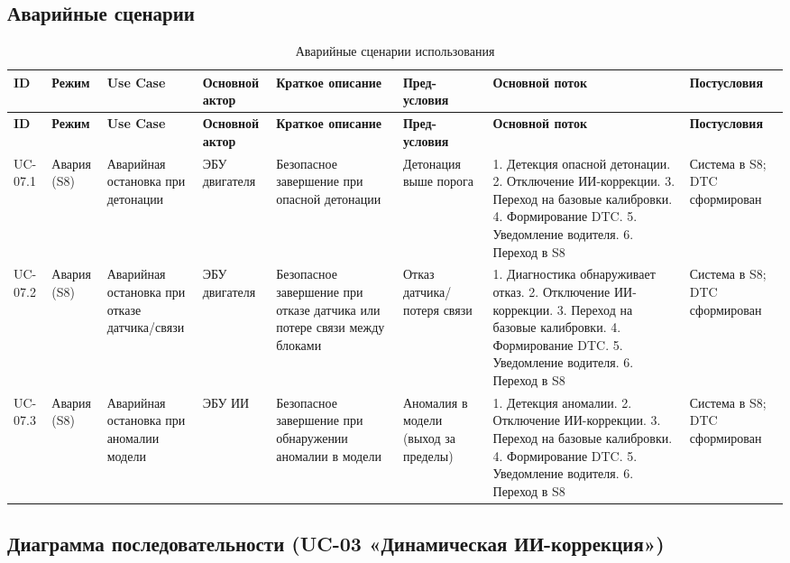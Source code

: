 \documentclass[14pt, a4paper]{extarticle}
\begin{document}
				\subsection{Аварийные сценарии}
					{\fontsize{9}{11}\selectfont
						\begin{xltabular}{\textwidth}{|L|L|L|L|L|L|L|L|}
						\caption{Аварийные сценарии использования}\label{tab:usecases-emergency}\\
						\hline
						\textbf{ID} & \textbf{Режим} & \textbf{Use Case} & \textbf{Основной актор} & \textbf{Краткое описание} & \textbf{Пред- условия} & \textbf{Основной поток} & \textbf{Постусловия} \\
						\hline
						\endfirsthead
						\hline
						\textbf{ID} & \textbf{Режим} & \textbf{Use Case} & \textbf{Основной актор} & \textbf{Краткое описание} & \textbf{Пред- условия} & \textbf{Основной поток} & \textbf{Постусловия} \\
						\hline
						\endhead
						\hline
						\endfoot
						\hline
						\endlastfoot
						UC-07.1 & Авария (S8) & Аварийная остановка при детонации & ЭБУ двигателя & Безопасное завершение при опасной детонации & Детонация выше порога & 1. Детекция опасной детонации. 2. Отключение ИИ-коррекции. 3. Переход на базовые калибровки. 4. Формирование DTC. 5. Уведомление водителя. 6. Переход в S8 & Система в S8; DTC сформирован \\
						\hline
						UC-07.2 & Авария (S8) & Аварийная остановка при отказе датчика/связи & ЭБУ двигателя & Безопасное завершение при отказе датчика или потере связи между блоками & Отказ датчика/потеря связи & 1. Диагностика обнаруживает отказ. 2. Отключение ИИ-коррекции. 3. Переход на базовые калибровки. 4. Формирование DTC. 5. Уведомление водителя. 6. Переход в S8 & Система в S8; DTC сформирован \\
						\hline
						UC-07.3 & Авария (S8) & Аварийная остановка при аномалии модели & ЭБУ ИИ & Безопасное завершение при обнаружении аномалии в модели & Аномалия в модели (выход за пределы) & 1. Детекция аномалии. 2. Отключение ИИ-коррекции. 3. Переход на базовые калибровки. 4. Формирование DTC. 5. Уведомление водителя. 6. Переход в S8 & Система в S8; DTC сформирован \\
						\hline
					\end{xltabular}}
					
				\subsection{Диаграмма последовательности (UC-03 «Динамическая ИИ-коррекция»)}
				
\end{document}
